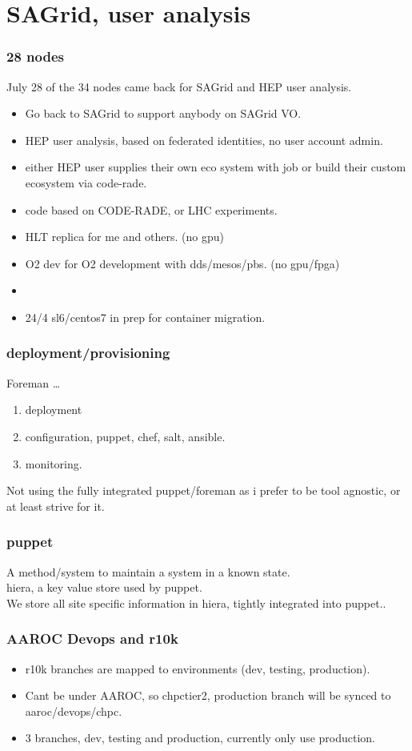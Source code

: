 \documentclass{beamer}
\begin{document}
\section{SAGrid, user analysis}
\begin{frame}
\frametitle{28 nodes}
July 28 of the 34 nodes came back for SAGrid and HEP user analysis.
\begin{itemize}
  \item Go back to SAGrid to support anybody on SAGrid VO.
  \item HEP user analysis, based on federated identities, no user account admin.
  \item either HEP user supplies their own eco system with job or build their custom ecosystem via code-rade.
  \item code based on CODE-RADE, or LHC experiments.
  \item HLT replica for me and others. (no gpu)
  \item O2 dev for O2 development with dds/mesos/pbs. (no gpu/fpga)
  \item \color{red}{Local Storage for users, eos and lustre.}
  \item 24/4 sl6/centos7 in prep for container migration.
\end{itemize}
\end{frame}

\begin{frame}
  \frametitle{deployment/provisioning}
  Foreman \ldots
  \begin{enumerate}
    \item deployment
    \item configuration, puppet, chef, salt, ansible.
    \item monitoring.
  \end{enumerate}
  Not using the fully integrated puppet/foreman as i prefer to be 
  tool agnostic, or at least strive for it.
\end{frame}


\begin{frame}
  \frametitle{puppet}
  A method/system to maintain a system in a known state.\\
  hiera, a key value store used by puppet.\\
  We store all site specific information in hiera, tightly integrated into puppet..
\end{frame}

\begin{frame}
\frametitle{AAROC Devops and r10k}
\begin{itemize}
  \item r10k branches are mapped to environments (dev, testing, production).\\
  \item Cant be under AAROC, so chpctier2, production branch will be synced to aaroc/devops/chpc.\\
  \item 3 branches, dev, testing and production, currently only use production.
\end{itemize}
\end{frame}
\end{document}
